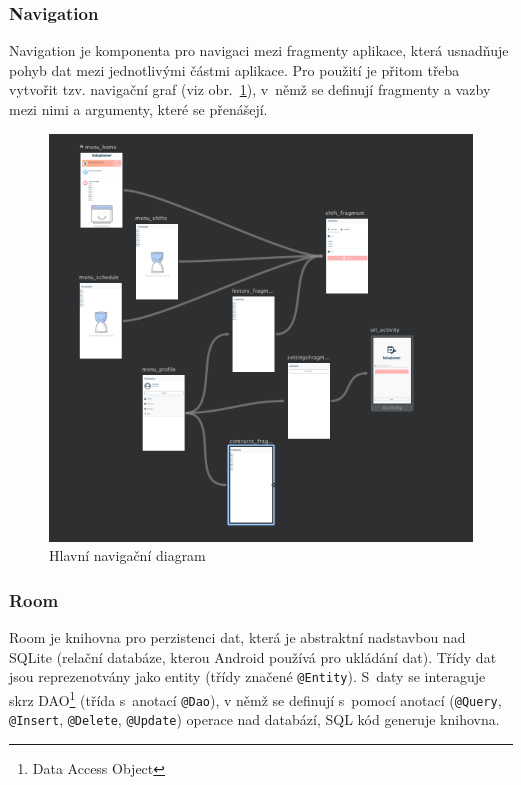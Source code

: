 \documentclass[twoside]{ctuthesis}
\begin{document}
\subsubsection{Navigation}
Navigation je komponenta pro navigaci mezi fragmenty aplikace, která usnadňuje pohyb dat mezi jednotlivými částmi aplikace. Pro použití je přitom třeba vytvořit tzv. navigační graf (viz obr.~\ref{fig:main-navigation}), v~němž se definují fragmenty a vazby mezi nimi a argumenty, které se přenášejí.

\begin{figure}[h!]
	\includegraphics[scale=.65]{img/navigation.png}
	\caption{Hlavní navigační diagram}
	\label{fig:main-navigation}
\end{figure}

\subsubsection{Room}
Room je knihovna pro perzistenci dat, která je abstraktní nadstavbou nad SQLite (relační databáze, kterou Android používá pro ukládání dat). Třídy dat jsou reprezenotvány jako entity (třídy značené \texttt{@Entity}). S~daty se interaguje skrz DAO\footnote{Data Access Object} (třída s~anotací \texttt{@Dao}), v němž se definují s~pomocí anotací (\texttt{@Query}, \texttt{@Insert}, \texttt{@Delete}, \texttt{@Update}) operace nad databází, SQL kód generuje knihovna. \cite{android2020room}
\end{document}
